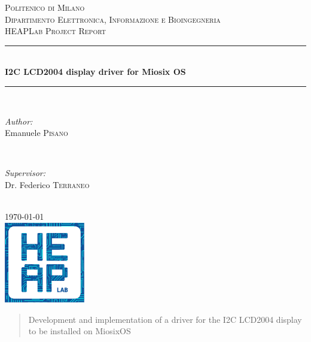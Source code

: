 \documentclass[12pt]{article}
\begin{document}
\begin{titlepage}

\newcommand{\HRule}{\rule{\linewidth}{0.5mm}}

\center

\textsc{\LARGE Politenico di Milano}\\[1.5cm]
\textsc{\Large Dipartimento Elettronica, Informazione e Bioingegneria}\\[0.5cm]
\textsc{\large HEAPLab Project Report}\\[0.5cm] 

\HRule \\[0.4cm]
{ \huge \bfseries I2C LCD2004 display driver for Miosix OS}\\[0.4cm]
\HRule \\[1.5cm]

\begin{minipage}{0.4\textwidth}
\begin{flushleft} \large
\emph{Author:}\\
Emanuele \textsc{Pisano}
\end{flushleft}
\end{minipage}
~
\begin{minipage}{0.4\textwidth}
\begin{flushright} \large
\emph{Supervisor:} \\
Dr. Federico \textsc{Terraneo}
\end{flushright}
\end{minipage}\\[2cm]

{\large \today}\\[2cm]

\includegraphics[width=100pt]{heaplogo.pdf}\\[1cm]
 
\vfill

\end{titlepage}




\begin{abstract}
Development and implementation of a driver for the I2C LCD2004 display to be installed on MiosixOS
\end{abstract}
\end{document}
